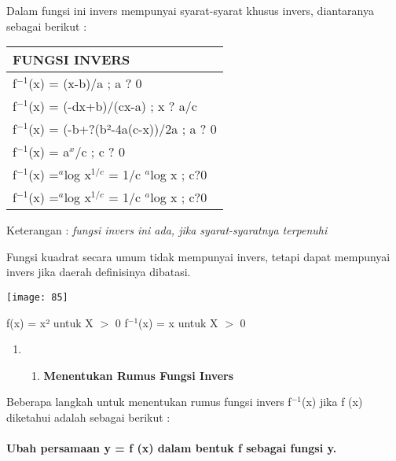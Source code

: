 \documentclass[11pt,fleqn]{book} %
\begin{document}
Dalam fungsi ini invers mempunyai syarat-syarat khusus invers, diantaranya sebagai berikut :\textbf{}

\begin{tabular}{|p{3.1in}|} \hline 
\textbf{FUNGSI INVERS} \\ \hline 
f${}^{-1}$(x) = (x-b)/a ; a ? 0 \\ \hline 
f${}^{-1}$(x) = (-dx+b)/(cx-a) ; x ? a/c \\ \hline 
f${}^{-1}$(x) = (-b+?(b²-4a(c-x))/2a ; a ? 0 \\ \hline 
f${}^{-1}$(x) = a${}^{x}$/c ; c ? 0 \\ \hline 
f${}^{-1}$(x) =${}^{ a}$log x${}^{1/c}$ = 1/c ${}^{a}$log x ; c?0 \\ \hline 
f${}^{-1}$(x) =${}^{ a}$log x${}^{1/c}$ = 1/c ${}^{a}$log x ; c?0 \\ \hline 
\end{tabular}

Keterangan : \textit{fungsi invers ini ada, jika syarat-syaratnya terpenuhi}

\noindent 

\noindent Fungsi kuadrat secara umum tidak mempunyai invers, tetapi dapat mempunyai invers jika daerah definisinya dibatasi.

\noindent 

\begin{center}
\noindent \texttt{[image: 85]}
\end{center}

\noindent 

\noindent 

\noindent f(x) = x² untuk X $>$ 0 f${}^{-1}$(x) = x untuk X $>$ 0

\noindent 

\begin{enumerate}
\item \begin{enumerate}
\item  \textbf{Menentukan Rumus Fungsi Invers}
\end{enumerate}
\end{enumerate}

Beberapa langkah untuk menentukan rumus fungsi invers f${}^{-1}$(x) jika f (x) diketahui adalah sebagai berikut :\textbf{}


\paragraph{ Ubah persamaan y = f (x) dalam bentuk f sebagai fungsi y.}
\end{document}
